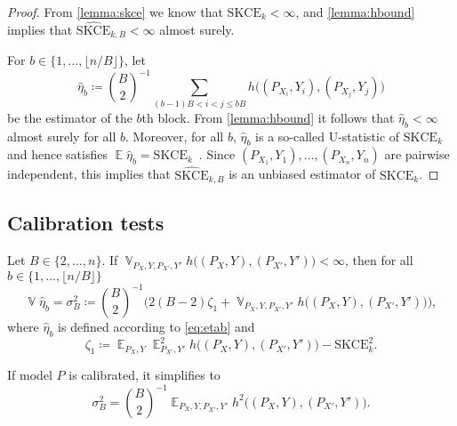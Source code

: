 \documentclass{article}
\DeclareMathOperator{\Exp}{\mathbb{E}}
\DeclareMathOperator{\Var}{\mathbb{V}}
\begin{document}
\lemmaskceblock*

\begin{proof}
From \cref{lemma:skce} we know that $\mathrm{SKCE}_k < \infty$,
and \cref{lemma:hbound} implies that
$\widehat{\mathrm{SKCE}}_{k,B} < \infty$ almost surely.

For $b \in \{1, \ldots, \lfloor n / B \rfloor\}$, let
\begin{equation}\label{eq:etab}
    \widehat{\eta}_b \coloneqq \binom{B}{2}^{-1} \sum_{(b - 1) B < i < j \leq bB} h\big((P_{X_{i}}, Y_i), (P_{X_j}, Y_j)\big)
\end{equation}
be the estimator of the $b$th block. From \cref{lemma:hbound} it follows
that $\widehat{\eta}_b < \infty$ almost surely for all $b$.
Moreover, for all $b$, $\widehat{\eta}_b$ is a so-called U-statistic of
$\mathrm{SKCE}_k$ and hence satisfies
$\Exp \widehat{\eta}_b = \mathrm{SKCE}_k$~\citep[see, e.g.,][]{Vaart1998}.
Since $(P_{X_1}, Y_1), \ldots, (P_{X_n}, Y_n)$ are pairwise independent,
this implies that $\widehat{\mathrm{SKCE}}_{k,B}$ is an unbiased
estimator of $\mathrm{SKCE}_k$.
\end{proof}

\subsection{Calibration tests}

\begin{lemma}\label{lemma:eta_variance}
    Let $B \in \{2, \ldots, n\}$.
    If $\Var_{P_X,Y,P_{X'},Y'} h\big((P_X, Y), (P_{X'}, Y')\big) < \infty$,
    then for all $b \in \{1, \ldots, \lfloor n / B \rfloor\}$
    \begin{equation*}
        \Var \widehat{\eta}_b = \sigma^2_B \coloneqq \binom{B}{2}^{-1} \Big(2(B - 2) \zeta_1
        + \Var_{P_X,Y,P_{X'},Y'} h\big((P_X, Y), (P_{X'}, Y')\big)\Big),
    \end{equation*}
    where $\widehat{\eta}_b$ is defined according to \cref{eq:etab} and
    \begin{equation}\label{eq:def_zeta1}
        \zeta_1 \coloneqq \Exp_{P_X,Y} \Exp^2_{P_{X'},Y'} h\big((P_X, Y), (P_{X'}, Y')\big) - \mathrm{SKCE}^2_k.
    \end{equation}

    If model $P$ is calibrated, it simplifies to
    \begin{equation*}
        \sigma^2_B = \binom{B}{2}^{-1} \Exp_{P_X,Y,P_{X'},Y'} h^2\big((P_X, Y), (P_{X'}, Y')\big).
    \end{equation*}
\end{lemma}
\end{document}
